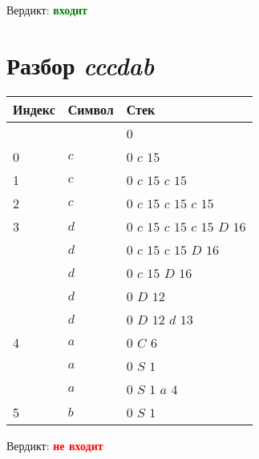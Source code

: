 \documentclass[12pt]{article}
\begin{document}
\bigbreak

Вердикт: \textbf{\textcolor{green}{входит}}

\section*{Разбор \textit{cccdab}}

\begin{tabular}{|l|l|l|}
\hline
Индекс & Символ & Стек\\ \hline
 &  & 0\\ \hline
0 & $c$ & $0$ $c$ $15$\\ \hline
1 & $c$ & $0$ $c$ $15$ $c$ $15$\\ \hline
2 & $c$ & $0$ $c$ $15$ $c$ $15$ $c$ $15$\\ \hline
3 & $d$ & $0$ $c$ $15$ $c$ $15$ $c$ $15$ $D$ $16$\\ \hline
 & $d$ & $0$ $c$ $15$ $c$ $15$ $D$ $16$\\ \hline
 & $d$ & $0$ $c$ $15$ $D$ $16$\\ \hline
 & $d$ & $0$ $D$ $12$\\ \hline
 & $d$ & $0$ $D$ $12$ $d$ $13$\\ \hline
4 & $a$ & $0$ $C$ $6$\\ \hline
 & $a$ & $0$ $S$ $1$\\ \hline
 & $a$ & $0$ $S$ $1$ $a$ $4$\\ \hline
5 & $b$ & $0$ $S$ $1$\\ \hline
\end{tabular}

\bigbreak

Вердикт: \textbf{\textcolor{red}{не входит}}
\end{document}

